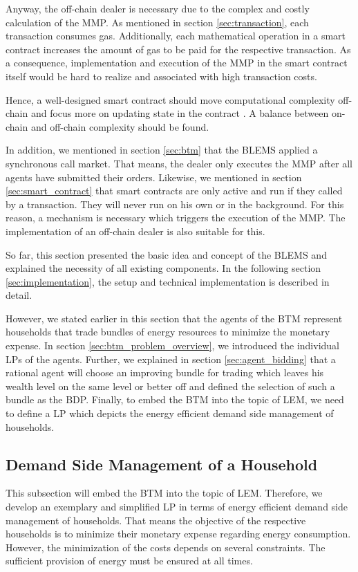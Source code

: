 Anyway, the off-chain dealer is necessary due to the complex and costly calculation of the MMP.
As mentioned in section \ref{sec:transaction}, each transaction consumes gas. Additionally, each mathematical operation in a smart contract
increases the amount of gas to be paid for the respective transaction. As a consequence, implementation and execution of the MMP
in the smart contract itself would be hard to realize and associated with high transaction costs. 

Hence, a well-designed smart contract should move computational complexity off-chain
and focus more on updating state in the contract . A balance between on-chain
and off-chain complexity should be found.

In addition, we mentioned in section \ref{sec:btm} that the BLEMS applied a synchronous
call market. That means, the dealer only executes the MMP after all agents have submitted their orders.
Likewise, we mentioned in section \ref{sec:smart_contract} that smart contracts are only active and run if they called by a transaction.
They will never run on his own or in the background. For this reason, a mechanism is necessary which triggers the execution of the 
MMP. The implementation of an off-chain dealer is also suitable for this.

So far, this section presented the basic idea and concept of the BLEMS
and explained the necessity of all existing components. In the following section \ref{sec:implementation}, 
the setup and technical implementation is described in detail. 

However, we stated earlier in this section that the agents of the BTM represent households
that trade bundles of energy resources to minimize the monetary expense. 
In section \ref{sec:btm_problem_overview}, we introduced the individual LPs of the agents.
Further, we explained in section \ref{sec:agent_bidding} that a rational agent will choose an improving bundle for 
trading which leaves his wealth level on the same level or better off and defined the selection of such a bundle 
as the BDP.
Finally, to embed the BTM into the topic of LEM, we need to define 
a LP which depicts the energy efficient demand side management of households.

\subsection{Demand Side Management of a Household}
This subsection will embed the BTM into the topic of LEM. 
Therefore, we develop an exemplary and simplified LP in terms of energy efficient demand side management of households. 
That means the objective of the respective households is to minimize their monetary expense regarding energy consumption.
However, the minimization of the costs depends on several constraints.
The sufficient provision of energy must be ensured at all times.


